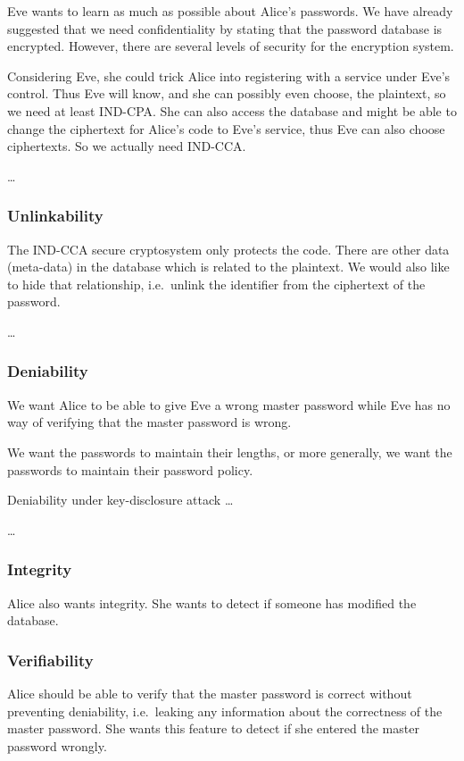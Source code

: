 Eve wants to learn as much as possible about Alice's passwords.
We have already suggested that we need confidentiality by stating that the 
password database is encrypted.
However, there are several levels of security for the encryption system.

Considering Eve, she could trick Alice into registering with a service under 
Eve's control.
Thus Eve will know, and she can possibly even choose, the plaintext, so we need 
at least \ac{IND-CPA}.
She can also access the database and might be able to change the ciphertext for
Alice's code to Eve's service, thus Eve can also choose ciphertexts.
So we actually need \ac{IND-CCA}.

\begin{definition}
  \dots
\end{definition}

\subsubsection{Unlinkability}

The \ac{IND-CCA} secure cryptosystem only protects the code.
There are other data (meta-data) in the database which is related to the 
plaintext.
We would also like to hide that relationship, i.e.\ unlink the identifier from 
the ciphertext of the password.

\begin{definition}[Unlinkability]
  \dots
\end{definition}

\subsubsection{Deniability}

We want Alice to be able to give Eve a wrong master password while Eve has no 
way of verifying that the master password is wrong.

We want the passwords to maintain their lengths, or more generally, we want the 
passwords to maintain their password policy.

Deniability under key-disclosure attack \dots

\begin{definition}
  \dots
\end{definition}

\subsubsection{Integrity}

Alice also wants integrity.
She wants to detect if someone has modified the database.

\subsubsection{Verifiability}

Alice should be able to verify that the master password is correct without 
preventing deniability, i.e.\ leaking any information about the correctness of 
the master password.
She wants this feature to detect if she entered the master password wrongly.

